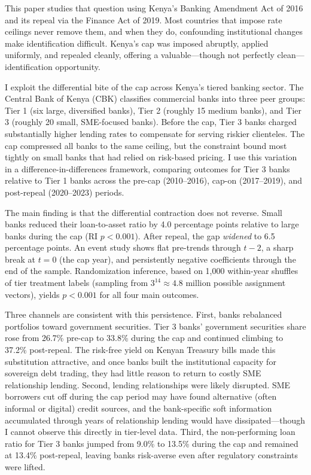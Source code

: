 \documentclass[12pt]{article}
\begin{document}
This paper studies that question using Kenya's Banking Amendment Act of 2016 and its repeal via the Finance Act of 2019. Most countries that impose rate ceilings never remove them, and when they do, confounding institutional changes make identification difficult. Kenya's cap was imposed abruptly, applied uniformly, and repealed cleanly, offering a valuable---though not perfectly clean---identification opportunity.

I exploit the differential bite of the cap across Kenya's tiered banking sector. The Central Bank of Kenya (CBK) classifies commercial banks into three peer groups: Tier 1 (six large, diversified banks), Tier 2 (roughly 15 medium banks), and Tier 3 (roughly 20 small, SME-focused banks). Before the cap, Tier 3 banks charged substantially higher lending rates to compensate for serving riskier clienteles. The cap compressed all banks to the same ceiling, but the constraint bound most tightly on small banks that had relied on risk-based pricing. I use this variation in a difference-in-differences framework, comparing outcomes for Tier 3 banks relative to Tier 1 banks across the pre-cap (2010--2016), cap-on (2017--2019), and post-repeal (2020--2023) periods.

The main finding is that the differential contraction does not reverse. Small banks reduced their loan-to-asset ratio by 4.0 percentage points relative to large banks during the cap (RI $p < 0.001$). After repeal, the gap \textit{widened} to 6.5 percentage points. An event study shows flat pre-trends through $t-2$, a sharp break at $t = 0$ (the cap year), and persistently negative coefficients through the end of the sample. Randomization inference, based on 1,000 within-year shuffles of tier treatment labels (sampling from $3^{14} \approx 4.8$ million possible assignment vectors), yields $p < 0.001$ for all four main outcomes.

Three channels are consistent with this persistence. First, banks rebalanced portfolios toward government securities. Tier 3 banks' government securities share rose from 26.7\% pre-cap to 33.8\% during the cap and continued climbing to 37.2\% post-repeal. The risk-free yield on Kenyan Treasury bills made this substitution attractive, and once banks built the institutional capacity for sovereign debt trading, they had little reason to return to costly SME relationship lending. Second, lending relationships were likely disrupted. SME borrowers cut off during the cap period may have found alternative (often informal or digital) credit sources, and the bank-specific soft information accumulated through years of relationship lending would have dissipated---though I cannot observe this directly in tier-level data. Third, the non-performing loan ratio for Tier 3 banks jumped from 9.0\% to 13.5\% during the cap and remained at 13.4\% post-repeal, leaving banks risk-averse even after regulatory constraints were lifted.
\end{document}
